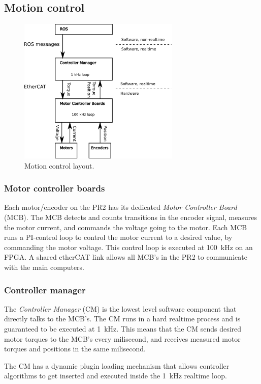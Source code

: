 \subsection{Motion control}


\begin{figure}[h]
\centering
\includegraphics[width=290px]{images/mechanism_control.png}
\caption{Motion control layout.}
\label{fig:motion_control}
\end{figure}


\subsubsection{Motor controller boards}
Each motor/encoder on the PR2 has its dedicated \emph{Motor Controller
  Board} (MCB). The MCB detects and counts transitions in the encoder
signal, measures the motor current, and commands the
voltage going to the motor. Each MCB runs a PI-control loop to control
the motor current to a desired value, by commanding the motor
voltage. This control loop is executed at 100~kHz on an FPGA.  A
shared etherCAT link allows all MCB's in the PR2 to communicate with
the main computers.

\subsubsection{Controller manager}
The \emph{Controller Manager} (CM) is the lowest level software
component that directly talks to the MCB's. The CM runs in a hard
realtime process and is guaranteed to be executed at 1~kHz. This means that
the CM sends desired motor torques to the MCB's every milisecond, and
receives measured motor torques and positions in the same milisecond.

The CM has a dynamic plugin loading mechanism that allows controller
algorithms to get inserted and executed inside the 1~kHz realtime
loop.


